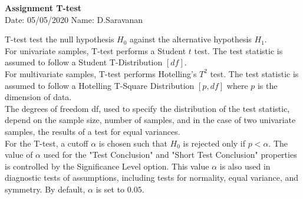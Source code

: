 \documentclass[a4paper,11pt,openright]{report}
\begin{document}
\singlespacing
\pagestyle{plain}

\begin{center}
\textbf{Assignment T-test} \\
Date: 05/05/2020 \hspace{2mm} Name: D.Saravanan
\end{center}

\vspace{10px}

T-test test the null hypothesis $H_{0}$ against the alternative hypothesis $H_{1}$. \\

For univariate samples, T-test performs a Student $t$ test. The test statistic is assumed to
follow a Student T-Distribution $[df]$. \\ 

For multivariate samples, T-test performs Hotelling's $T^{2}$ test. The test statistic is
assumed to follow a Hotelling T-Square Distribution $[p,df]$ where $p$ is the dimension of
data. \\

The degrees of freedom df, used to specify the distribution of the test statistic, depend on
the sample size, number of samples, and in the case of two univariate samples, the results 
of a test for equal variances. \\ 

For the T-test, a cutoff $\alpha$ is chosen such that $H_{0}$ is rejected only if $p < 
\alpha$. The value of $\alpha$ used for the "Test Conclusion" and "Short Test Conclusion"
properties is controlled by the Significance Level option. This value $\alpha$ is also used
in diagnostic tests of assumptions, including tests for normality, equal variance, and
symmetry. By default, $\alpha$ is set to $0.05$. \\
\end{document}
